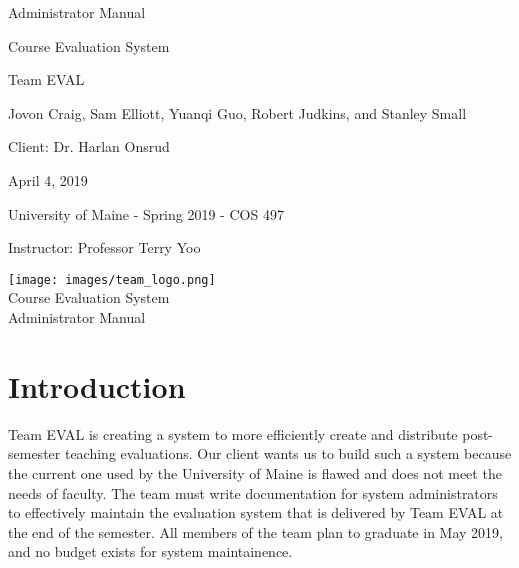 \documentclass{article}
\begin{document}
\begin{titlepage}

\centering
\vspace*{2cm}
{\Huge Administrator Manual\par}
\vspace{.25cm}
{\LARGE Course Evaluation System\par}
\vspace{1cm}
{\Large Team EVAL\par}
\vspace{.2cm}
{\Large Jovon Craig, Sam Elliott, Yuanqi Guo, Robert Judkins, and Stanley Small\par}
\vspace{1cm}
{\Large Client: Dr. Harlan Onsrud\par}
\vspace{1cm}
{\Large April 4, 2019\par}
\vspace{11cm}

University of Maine - Spring 2019 - COS 497

Instructor: Professor Terry Yoo

\end{titlepage}

\newpage

\begin{center}
{\texttt{[image: images/team\_logo.png]}} \\ 	\bigskip
{\LARGE Course Evaluation System } \\ \medskip
{\large Administrator Manual } \\ \medskip
\end{center}

\tableofcontents

\newpage

\section{Introduction}

Team EVAL is creating a system to more efficiently create and distribute post-semester teaching evaluations. Our client wants us to build such a system because the current one used by the University of Maine is flawed and does not meet the needs of faculty. The team must write documentation for system administrators to effectively maintain the evaluation system that is delivered by Team EVAL at the end of the semester. All members of the team plan to graduate in May 2019, and no budget exists for system maintainence.
 
\end{document}
